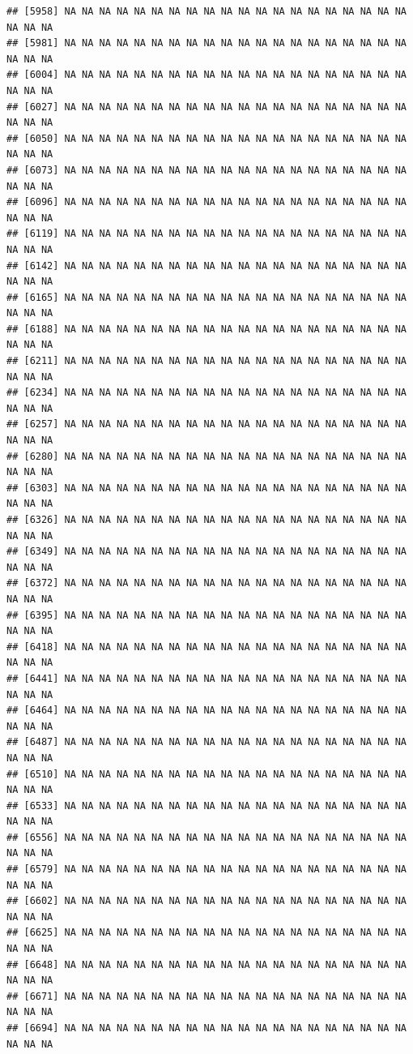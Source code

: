 \documentclass{article}\usepackage[]{graphicx}\usepackage[]{color}
\makeatletter
\newenvironment{kframe}{%
 \def\at@end@of@kframe{}%
 \ifinner\ifhmode%
  \def\at@end@of@kframe{\end{minipage}}%
  \begin{minipage}{\columnwidth}%
 \fi\fi%
 \def\FrameCommand##1{\hskip\@totalleftmargin \hskip-\fboxsep
 \colorbox{shadecolor}{##1}\hskip-\fboxsep
     \hskip-\linewidth \hskip-\@totalleftmargin \hskip\columnwidth}%
 \MakeFramed {\advance\hsize-\width
   \@totalleftmargin\z@ \linewidth\hsize
   \@setminipage}}%
 {\par\unskip\endMakeFramed%
 \at@end@of@kframe}
\newenvironment{knitrout}{}{} %
\makeatother
\begin{document}
\begin{knitrout}
\begin{kframe}
\begin{verbatim}
## [5958] NA NA NA NA NA NA NA NA NA NA NA NA NA NA NA NA NA NA NA NA NA NA NA
## [5981] NA NA NA NA NA NA NA NA NA NA NA NA NA NA NA NA NA NA NA NA NA NA NA
## [6004] NA NA NA NA NA NA NA NA NA NA NA NA NA NA NA NA NA NA NA NA NA NA NA
## [6027] NA NA NA NA NA NA NA NA NA NA NA NA NA NA NA NA NA NA NA NA NA NA NA
## [6050] NA NA NA NA NA NA NA NA NA NA NA NA NA NA NA NA NA NA NA NA NA NA NA
## [6073] NA NA NA NA NA NA NA NA NA NA NA NA NA NA NA NA NA NA NA NA NA NA NA
## [6096] NA NA NA NA NA NA NA NA NA NA NA NA NA NA NA NA NA NA NA NA NA NA NA
## [6119] NA NA NA NA NA NA NA NA NA NA NA NA NA NA NA NA NA NA NA NA NA NA NA
## [6142] NA NA NA NA NA NA NA NA NA NA NA NA NA NA NA NA NA NA NA NA NA NA NA
## [6165] NA NA NA NA NA NA NA NA NA NA NA NA NA NA NA NA NA NA NA NA NA NA NA
## [6188] NA NA NA NA NA NA NA NA NA NA NA NA NA NA NA NA NA NA NA NA NA NA NA
## [6211] NA NA NA NA NA NA NA NA NA NA NA NA NA NA NA NA NA NA NA NA NA NA NA
## [6234] NA NA NA NA NA NA NA NA NA NA NA NA NA NA NA NA NA NA NA NA NA NA NA
## [6257] NA NA NA NA NA NA NA NA NA NA NA NA NA NA NA NA NA NA NA NA NA NA NA
## [6280] NA NA NA NA NA NA NA NA NA NA NA NA NA NA NA NA NA NA NA NA NA NA NA
## [6303] NA NA NA NA NA NA NA NA NA NA NA NA NA NA NA NA NA NA NA NA NA NA NA
## [6326] NA NA NA NA NA NA NA NA NA NA NA NA NA NA NA NA NA NA NA NA NA NA NA
## [6349] NA NA NA NA NA NA NA NA NA NA NA NA NA NA NA NA NA NA NA NA NA NA NA
## [6372] NA NA NA NA NA NA NA NA NA NA NA NA NA NA NA NA NA NA NA NA NA NA NA
## [6395] NA NA NA NA NA NA NA NA NA NA NA NA NA NA NA NA NA NA NA NA NA NA NA
## [6418] NA NA NA NA NA NA NA NA NA NA NA NA NA NA NA NA NA NA NA NA NA NA NA
## [6441] NA NA NA NA NA NA NA NA NA NA NA NA NA NA NA NA NA NA NA NA NA NA NA
## [6464] NA NA NA NA NA NA NA NA NA NA NA NA NA NA NA NA NA NA NA NA NA NA NA
## [6487] NA NA NA NA NA NA NA NA NA NA NA NA NA NA NA NA NA NA NA NA NA NA NA
## [6510] NA NA NA NA NA NA NA NA NA NA NA NA NA NA NA NA NA NA NA NA NA NA NA
## [6533] NA NA NA NA NA NA NA NA NA NA NA NA NA NA NA NA NA NA NA NA NA NA NA
## [6556] NA NA NA NA NA NA NA NA NA NA NA NA NA NA NA NA NA NA NA NA NA NA NA
## [6579] NA NA NA NA NA NA NA NA NA NA NA NA NA NA NA NA NA NA NA NA NA NA NA
## [6602] NA NA NA NA NA NA NA NA NA NA NA NA NA NA NA NA NA NA NA NA NA NA NA
## [6625] NA NA NA NA NA NA NA NA NA NA NA NA NA NA NA NA NA NA NA NA NA NA NA
## [6648] NA NA NA NA NA NA NA NA NA NA NA NA NA NA NA NA NA NA NA NA NA NA NA
## [6671] NA NA NA NA NA NA NA NA NA NA NA NA NA NA NA NA NA NA NA NA NA NA NA
## [6694] NA NA NA NA NA NA NA NA NA NA NA NA NA NA NA NA NA NA NA NA NA NA NA

\end{verbatim}
\end{kframe}
\end{knitrout}
\end{document}
